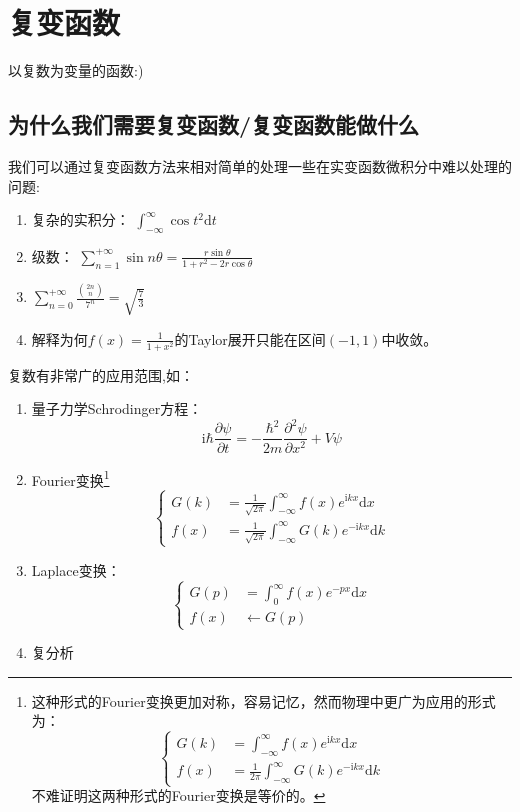 % 
% 
\chapter{复变函数}
	以复数为变量的函数:)
\section{为什么我们需要复变函数/复变函数能做什么}
我们可以通过复变函数方法来相对简单的处理一些在实变函数微积分中难以处理的问题:
\begin{enumerate}[fullwidth,itemindent=2em,label=(\arabic*)]
	\item 复杂的实积分： $\int_{-\infty}^{\infty}\cos t^2 \mathrm{d}t$
	\item 级数： $\sum_{n=1}^{+\infty}\sin n\theta = \frac{r\sin \theta}{1+r^2-2r\cos \theta}$
	\item $\sum_{n=0}^{+\infty}\frac{\binom{2n}{n}}{7^n} = \sqrt{\frac{7}{3}}$
	\item 解释为何$f(x) = \frac{1}{1+x^2}$的Taylor展开只能在区间$(-1,1)$中收敛。
\end{enumerate}

	复数有非常广的应用范围,如：
	\begin{enumerate}[fullwidth,itemindent=2em,label=(\arabic*)]
		\item 量子力学Schrodinger方程：
		\begin{equation}
			\mathrm{i}\hbar \frac{\partial \psi}{\partial t} = -\frac{\hbar^2}{2m}\frac{\partial^2\psi}{\partial x^2}+V\psi
		\end{equation}
		\item Fourier变换\footnote{这种形式的Fourier变换更加对称，容易记忆，然而物理中更广为应用的形式为：
		\[\left\{
			\begin{array}{ll}
			G(k) &= \int_{-\infty}^{\infty}f(x)e^{\mathrm{i}kx}\mathrm{d}x\\
			f(x) &= \frac{1}{2\pi}\int_{-\infty}^{\infty}G(k)e^{-\mathrm{i}kx}\mathrm{d}k
			\end{array}
			\right.\]
			不难证明这两种形式的Fourier变换是等价的。}
		\begin{equation}
			\left\{
			\begin{array}{ll}
			G(k) &= \frac{1}{\sqrt{2\pi}}\int_{-\infty}^{\infty}f(x)e^{\mathrm{i}kx}\mathrm{d}x\\
			f(x) &= \frac{1}{\sqrt{2\pi}}\int_{-\infty}^{\infty}G(k)e^{-\mathrm{i}kx}\mathrm{d}k
			\end{array}
			\right.
		\end{equation}
		
		\item Laplace变换：
		\begin{equation}
		\left\{
		\begin{array}{ll}
		G(p) &= \int_{0}^{\infty}f(x)e^{-px}\mathrm{d}x\\
		f(x) &\leftarrow G(p)
		\end{array}
		\right.
		\end{equation}
		\item 复分析
	\end{enumerate}

